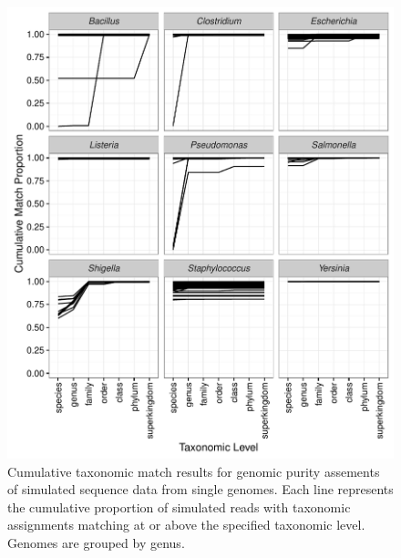 \documentclass[fleqn,10pt,lineno]{wlpeerj}\usepackage[]{graphicx}\usepackage[]{color}
\makeatletter
\def\maxwidth{ %
  \ifdim\Gin@nat@width>\linewidth
    \linewidth
  \else
    \Gin@nat@width
  \fi
}
\newenvironment{knitrout}{}{} %
\makeatother
\begin{document}
\begin{knitrout}
\color{fgcolor}\begin{figure}

{\centering \includegraphics[width=\maxwidth]{figure/single_org_cum-1} 

}

\caption[Cumulative taxonomic match results for genomic purity assements of simulated sequence data from single genomes]{Cumulative taxonomic match results for genomic purity assements of simulated sequence data from single genomes.  Each line represents the cumulative proportion of simulated reads with taxonomic assignments matching at or above the specified taxonomic level. Genomes are grouped by genus.}\label{fig:single_org_cum}
\end{figure}


\end{knitrout}
\end{document}
